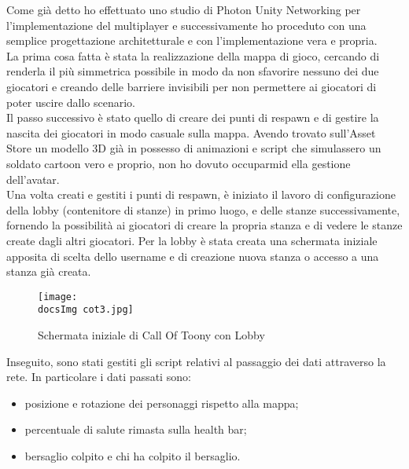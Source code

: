 Come gi\`a detto ho effettuato uno studio di Photon Unity Networking per l'implementazione del multiplayer e successivamente ho proceduto con una semplice progettazione architetturale e con l'implementazione vera e propria.\\

La prima cosa fatta \`e stata la realizzazione della mappa di gioco, cercando di renderla il pi\`u simmetrica possibile in modo da non sfavorire nessuno dei due giocatori e creando delle barriere invisibili per non permettere ai giocatori di poter uscire dallo scenario.\\
Il passo successivo \`e stato quello di creare dei punti di respawn e di gestire la nascita dei giocatori in modo casuale sulla mappa. Avendo trovato sull'Asset Store un modello 3D gi\`a in possesso di animazioni e script che simulassero un soldato cartoon vero e proprio, non ho dovuto occuparmid ella gestione dell'avatar.\\
Una volta creati e gestiti i punti di respawn, \`e iniziato il lavoro di configurazione della lobby (contenitore di stanze) in primo luogo, e delle stanze successivamente, fornendo la possibilit\`a ai giocatori di creare la propria stanza e di vedere le stanze create dagli altri giocatori. Per la lobby \`e stata creata una schermata iniziale apposita di scelta dello username e di creazione nuova stanza o accesso a una stanza gi\`a creata.

\begin{figure}[H]
	\centering
	\texttt{[image: \\docsImg cot3.jpg]}
	\caption{Schermata iniziale di Call Of Toony con Lobby}
	\label{fig:Schermata iniziale di Call Of Toony con Lobby}
\end{figure}

Inseguito, sono stati gestiti gli script relativi al passaggio dei dati attraverso la rete. In particolare i dati passati sono:

\begin{itemize}
	\item posizione e rotazione dei personaggi rispetto alla mappa;
	\item percentuale di salute rimasta sulla health bar;
	\item bersaglio colpito e chi ha colpito il bersaglio.
\end{itemize}

